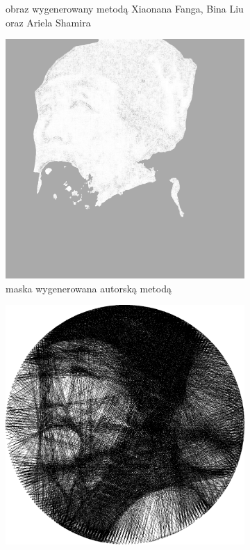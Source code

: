 \documentclass[a4paper, 12pt, polish, twoside]{extreport}
\begin{document}
\begin{figure}[H]
\begin{subfigure}{0.24\textwidth}
        \caption{obraz wygenerowany metodą Xiaonana Fanga, Bina Liu oraz Ariela Shamira}
        \label{comp-comp-dufu-gogh-b}
    \end{subfigure}
    \begin{subfigure}{0.24\textwidth}
        \centering
        \includegraphics[width = \textwidth]{img/6-comp/dufu_mask_c15_inv0_bg10_obj5_ed5.png}
        \caption{maska wygenerowana autorską metodą}
        \label{comp-comp-dufu-gogh-c}
    \end{subfigure}
    \begin{subfigure}{0.24\textwidth}
        \centering
        \includegraphics[width = \textwidth]{img/6-comp/dufu_e_i3000_c15_inv0_bg10_obj5_ed5.png}

\end{subfigure}
\end{figure}
\end{document}
